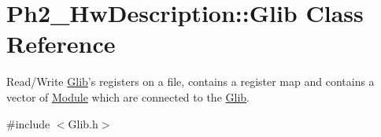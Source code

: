 \hypertarget{class_ph2___hw_description_1_1_glib}{\section{Ph2\-\_\-\-Hw\-Description\-:\-:Glib Class Reference}
\label{class_ph2___hw_description_1_1_glib}
}


Read/\-Write \hyperlink{class_ph2___hw_description_1_1_glib}{Glib}'s registers on a file, contains a register map and contains a vector of \hyperlink{class_ph2___hw_description_1_1_module}{Module} which are connected to the \hyperlink{class_ph2___hw_description_1_1_glib}{Glib}.  




{\ttfamily \#include $<$Glib.\-h$>$}

